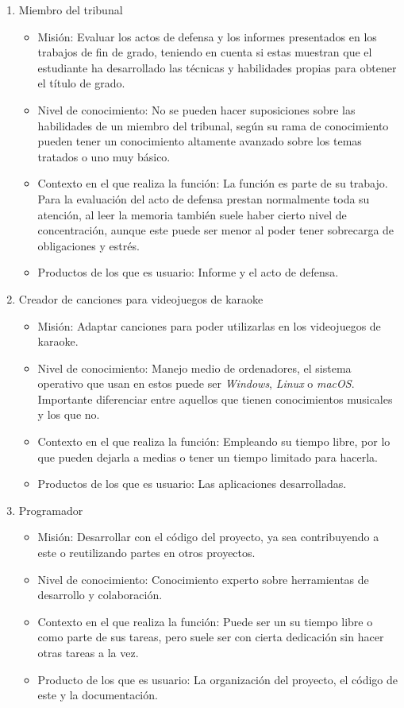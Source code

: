 \begin{enumerate}	
	\item{Miembro del tribunal}
	\begin{itemize}
		\item{Misión: Evaluar los actos de defensa y los informes presentados en los trabajos de fin de grado, teniendo en cuenta si estas muestran que el estudiante ha desarrollado las técnicas y habilidades propias para obtener el título de grado.}
		\item{Nivel de conocimiento: No se pueden hacer suposiciones sobre las habilidades de un miembro del tribunal, según su rama de conocimiento pueden tener un conocimiento altamente avanzado sobre los temas tratados o uno muy básico.}
		\item{Contexto en el que realiza la función: La función es parte de su trabajo. Para la evaluación del acto de defensa prestan normalmente toda su atención, al leer la memoria también suele haber cierto nivel de concentración, aunque este puede ser menor al poder tener sobrecarga de obligaciones y estrés.}
		\item{Productos de los que es usuario: Informe y el acto de defensa.}
	\end{itemize}
	
	\item{Creador de canciones para videojuegos de karaoke}
	\begin{itemize}
		\item{Misión: Adaptar canciones para poder utilizarlas en los videojuegos de karaoke.}
		\item{Nivel de conocimiento: Manejo medio de ordenadores, el sistema operativo que usan en estos puede ser \textit{Windows}, \textit{Linux} o \textit{macOS}. Importante diferenciar entre aquellos que tienen conocimientos musicales y los que no.}
		\item{Contexto en el que realiza la función: Empleando su tiempo libre, por lo que pueden dejarla a medias o tener un tiempo limitado para hacerla.}
		\item{Productos de los que es usuario: Las aplicaciones desarrolladas.}
	\end{itemize}
	
		\item{Programador}
	\begin{itemize}
		\item{Misión: Desarrollar con el código del proyecto, ya sea contribuyendo a este o reutilizando partes en otros proyectos.}
		\item{Nivel de conocimiento: Conocimiento experto sobre herramientas de desarrollo y colaboración.}
		\item{Contexto en el que realiza la función: Puede ser un su tiempo libre o como parte de sus tareas, pero suele ser con cierta dedicación sin hacer otras tareas a la vez.}
		\item{Producto de los que es usuario: La organización del proyecto, el código de este y la documentación.}
	\end{itemize}
\end{enumerate}

